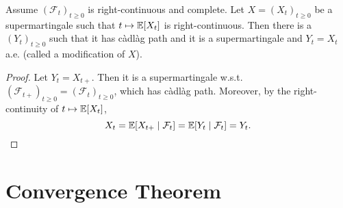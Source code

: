 \begin{thm}
    Assume $(\mathcal{F}_t)_{t\geq 0}$ is right-continuous and complete. Let $X=(X_t)_{t\geq 0}$ be a supermartingale such that $t \mapsto \mathbb{E}[X_t]$ is right-continuous. Then there is a $(Y_t)_{t \geq 0}$ such that it has c\`adl\`ag path and it is a supermartingale and $Y_t = X_t$ a.e. (called a modification of $X$).
\end{thm}
\begin{proof}
    Let $Y_t = X_{t+}$. Then it is a supermartingale w.s.t. $(\mathcal{F}_{t+})_{t\geq 0} = (\mathcal{F}_t)_{t\geq 0}$, which has c\`adl\`ag path. Moreover, by the right-continuity of $t \mapsto \mathbb{E}[X_t]$,
    \begin{equation*}
        X_t = \mathbb{E}[X_{t+} \mid \mathcal{F}_t] = \mathbb{E}[Y_t \mid \mathcal{F}_t] = Y_t. \qedhere
    \end{equation*}
\end{proof}

\section{Convergence Theorem}

